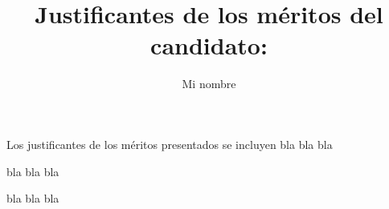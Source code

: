 \documentclass[a4paper,10pt]{article}
\begin{document}
	\pagestyle{plain}
		
	\title{Justificantes de los méritos del candidato:}
	\author{Mi nombre}
	\date{}
	
	\maketitle
	
	\section*{}
	Los justificantes de los méritos presentados se incluyen bla bla bla
	
	bla bla bla

	bla bla bla
	
	\tableofcontents



	\newpage
	
	
\end{document}
